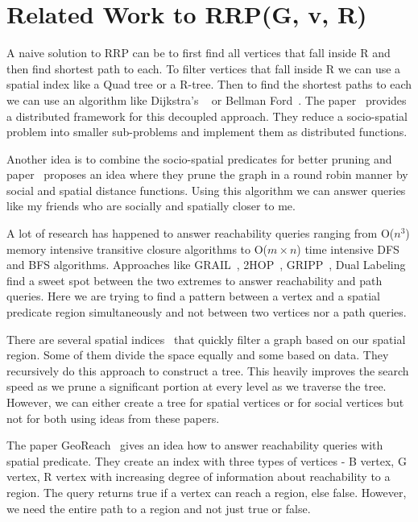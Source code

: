 \section{Related Work to RRP(G, v, R)}
A naive solution to RRP can be to first find all vertices that fall inside R and then find shortest path to each. To filter vertices that fall inside R we can use a spatial index like a Quad tree or a R-tree. Then to find the shortest paths to each we can use an algorithm like Dijkstra's ~\cite{S1990} or Bellman Ford~\cite{R1956}. The paper~\cite{NSD2013} provides a distributed framework for this decoupled approach. They reduce a socio-spatial problem into smaller sub-problems and implement them as distributed functions.

Another idea is to combine the socio-spatial predicates for better pruning and paper~\cite{KJY+2015} proposes an idea where they prune the graph in a round robin manner by social and spatial distance functions. Using this algorithm we can answer queries like my friends who are socially and spatially closer to me.

{A lot of research has happened to answer reachability queries ranging from O($n^3$}{) memory intensive transitive closure algorithms to O($m \times n$) time intensive DFS and BFS algorithms. Approaches like GRAIL~\cite{YCZ+2010}, 2HOP~\cite{CHK+2003}, GRIPP~\cite{SU2007}, Dual Labeling~\cite{HHJ+2006} find a sweet spot between the two extremes to answer reachability and path queries. Here we are trying to find a pattern between a vertex and a spatial predicate region simultaneously and not between two vertices nor a path queries. }

There are several spatial indices~\cite{PMA2001,H2006,SS2003} that quickly filter a graph based on our spatial region. Some of them divide the space equally and some based on data. They recursively do this approach to construct a tree. This heavily improves the search speed as we prune a significant portion at every level as we traverse the tree. However, we can either create a tree for spatial vertices or for social vertices but not for both using ideas from these papers.

{The paper GeoReach~\cite{YM2016} gives an idea how to answer reachability queries with spatial predicate. They create an index with three types of vertices - B vertex, G vertex, R vertex with increasing degree of information about reachability to a region. The query returns true if a vertex can reach a region, else false. However, we need the entire path to a region and not just true or false.}
